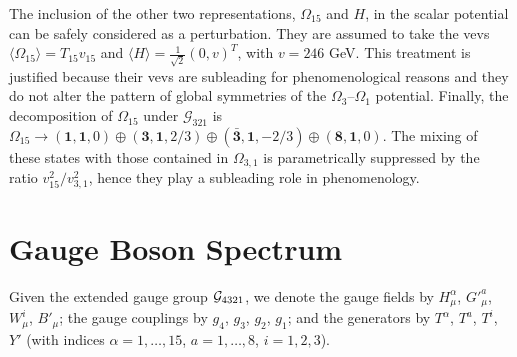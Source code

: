 The inclusion of the other two representations, $\Omega_{15}$ and $H$, in the scalar potential can be safely considered as a perturbation. They are assumed to take the vevs $\langle \Omega_{15} \rangle = T_{15} v_{15}$ and $\langle H \rangle = \tfrac{1}{\sqrt{2}} (0, v)^T$, with $v = 246$ GeV. This treatment is justified because their vevs are subleading for phenomenological reasons and they do not alter the pattern of global symmetries of the $\Omega_3$--$\Omega_1$ potential.
Finally, the decomposition of $\Omega_{15}$ under $\mathcal{G}_{321}$ is $\Omega_{15} \to (\mathbf{1},\mathbf{1},0) \oplus (\mathbf{3},\mathbf{1},2/3) \oplus (\mathbf{\bar 3},\mathbf{1},-2/3) \oplus (\mathbf{8}, \mathbf{1}, 0)$. The mixing of these states with those contained in $\Omega_{3,1}$ is parametrically suppressed by the ratio $v^2_{15} / v^2_{3,1}$, hence they play a subleading role in phenomenology.

\section{Gauge Boson Spectrum}
Given the extended gauge group $\mathcal{G}_{\rm 4321}$,
we denote the gauge fields by $H^\alpha_\mu$, $G'^a_\mu$, $W^i_\mu$, $B'_\mu$; the gauge couplings by $g_4$, $g_3$, $g_2$, $g_1$; and the generators by $T^\alpha$, $T^a$, $T^i$, $Y'$
(with indices $\alpha = 1, \dots, 15$, $a = 1, \dots, 8$, $i=1,2,3$). 

